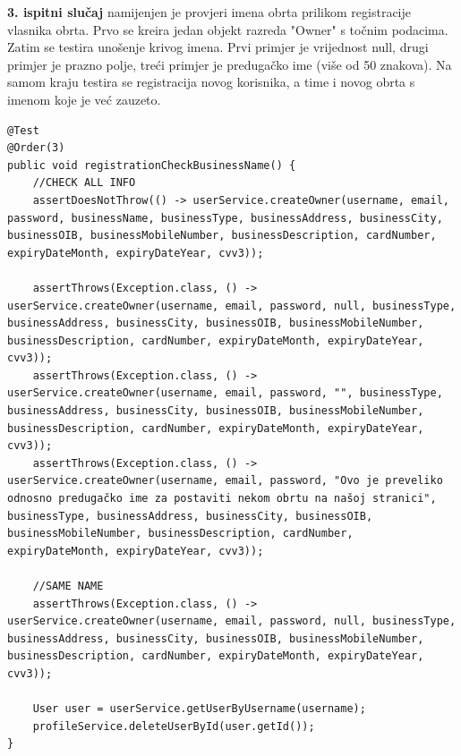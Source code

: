         \textbf{3. ispitni slučaj}{ namijenjen je provjeri imena obrta prilikom registracije vlasnika obrta. Prvo se kreira jedan objekt razreda "Owner" s točnim podacima. Zatim se testira unošenje krivog imena. Prvi primjer je vrijednost null, drugi primjer je prazno polje, treći primjer je predugačko ime (više od 50 znakova). Na samom kraju testira se registracija novog korisnika, a time i novog obrta s imenom koje je već zauzeto.}
           \begin{lstlisting}
@Test
@Order(3)
public void registrationCheckBusinessName() {
    //CHECK ALL INFO
    assertDoesNotThrow(() -> userService.createOwner(username, email, password, businessName, businessType, businessAddress, businessCity, businessOIB, businessMobileNumber, businessDescription, cardNumber, expiryDateMonth, expiryDateYear, cvv3));

    assertThrows(Exception.class, () -> userService.createOwner(username, email, password, null, businessType, businessAddress, businessCity, businessOIB, businessMobileNumber, businessDescription, cardNumber, expiryDateMonth, expiryDateYear, cvv3));
    assertThrows(Exception.class, () -> userService.createOwner(username, email, password, "", businessType, businessAddress, businessCity, businessOIB, businessMobileNumber, businessDescription, cardNumber, expiryDateMonth, expiryDateYear, cvv3));
    assertThrows(Exception.class, () -> userService.createOwner(username, email, password, "Ovo je preveliko odnosno predugačko ime za postaviti nekom obrtu na našoj stranici", businessType, businessAddress, businessCity, businessOIB, businessMobileNumber, businessDescription, cardNumber, expiryDateMonth, expiryDateYear, cvv3));

    //SAME NAME
    assertThrows(Exception.class, () -> userService.createOwner(username, email, password, null, businessType, businessAddress, businessCity, businessOIB, businessMobileNumber, businessDescription, cardNumber, expiryDateMonth, expiryDateYear, cvv3));

    User user = userService.getUserByUsername(username);
    profileService.deleteUserById(user.getId());
}
        \end{lstlisting}

